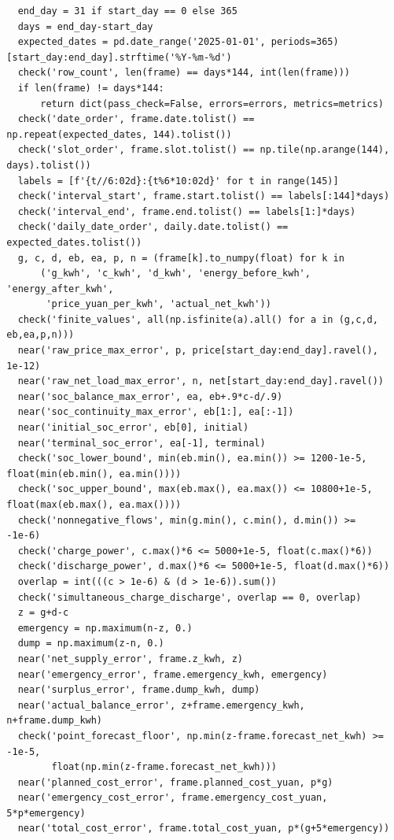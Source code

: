 \begin{verbatim}
    end_day = 31 if start_day == 0 else 365
    days = end_day-start_day
    expected_dates = pd.date_range('2025-01-01', periods=365)
  [start_day:end_day].strftime('%Y-%m-%d')
    check('row_count', len(frame) == days*144, int(len(frame)))
    if len(frame) != days*144:
        return dict(pass_check=False, errors=errors, metrics=metrics)
    check('date_order', frame.date.tolist() ==
  np.repeat(expected_dates, 144).tolist())
    check('slot_order', frame.slot.tolist() == np.tile(np.arange(144),
  days).tolist())
    labels = [f'{t//6:02d}:{t%6*10:02d}' for t in range(145)]
    check('interval_start', frame.start.tolist() == labels[:144]*days)
    check('interval_end', frame.end.tolist() == labels[1:]*days)
    check('daily_date_order', daily.date.tolist() ==
  expected_dates.tolist())
    g, c, d, eb, ea, p, n = (frame[k].to_numpy(float) for k in
        ('g_kwh', 'c_kwh', 'd_kwh', 'energy_before_kwh',
  'energy_after_kwh',
         'price_yuan_per_kwh', 'actual_net_kwh'))
    check('finite_values', all(np.isfinite(a).all() for a in (g,c,d,
  eb,ea,p,n)))
    near('raw_price_max_error', p, price[start_day:end_day].ravel(),
  1e-12)
    near('raw_net_load_max_error', n, net[start_day:end_day].ravel())
    near('soc_balance_max_error', ea, eb+.9*c-d/.9)
    near('soc_continuity_max_error', eb[1:], ea[:-1])
    near('initial_soc_error', eb[0], initial)
    near('terminal_soc_error', ea[-1], terminal)
    check('soc_lower_bound', min(eb.min(), ea.min()) >= 1200-1e-5,
  float(min(eb.min(), ea.min())))
    check('soc_upper_bound', max(eb.max(), ea.max()) <= 10800+1e-5,
  float(max(eb.max(), ea.max())))
    check('nonnegative_flows', min(g.min(), c.min(), d.min()) >=
  -1e-6)
    check('charge_power', c.max()*6 <= 5000+1e-5, float(c.max()*6))
    check('discharge_power', d.max()*6 <= 5000+1e-5, float(d.max()*6))
    overlap = int(((c > 1e-6) & (d > 1e-6)).sum())
    check('simultaneous_charge_discharge', overlap == 0, overlap)
    z = g+d-c
    emergency = np.maximum(n-z, 0.)
    dump = np.maximum(z-n, 0.)
    near('net_supply_error', frame.z_kwh, z)
    near('emergency_error', frame.emergency_kwh, emergency)
    near('surplus_error', frame.dump_kwh, dump)
    near('actual_balance_error', z+frame.emergency_kwh,
  n+frame.dump_kwh)
    check('point_forecast_floor', np.min(z-frame.forecast_net_kwh) >=
  -1e-5,
          float(np.min(z-frame.forecast_net_kwh)))
    near('planned_cost_error', frame.planned_cost_yuan, p*g)
    near('emergency_cost_error', frame.emergency_cost_yuan,
  5*p*emergency)
    near('total_cost_error', frame.total_cost_yuan, p*(g+5*emergency))

\end{verbatim}
